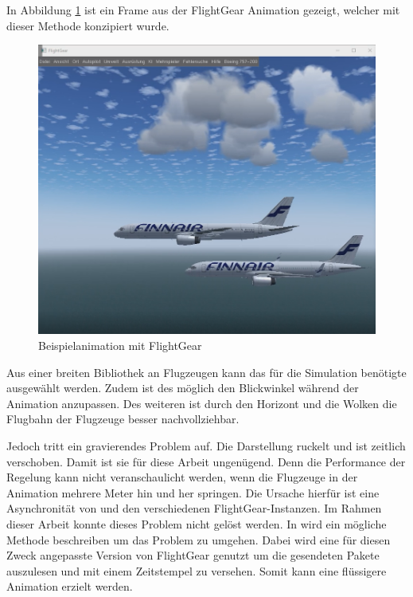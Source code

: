 In Abbildung \ref{fig:VisualFG2Planes} ist ein Frame aus der FlightGear Animation gezeigt, welcher mit dieser Methode konzipiert wurde.
\begin{figure}[h]
	\centering
	\includegraphics[width=\textwidth]{./Bilder/Visual_FG2Planes.png}
	\caption{Beispielanimation mit FlightGear}
	\label{fig:VisualFG2Planes}
\end{figure}
Aus einer breiten Bibliothek an Flugzeugen kann das für die Simulation benötigte ausgewählt werden. Zudem ist des möglich den Blickwinkel während der Animation anzupassen. Des weiteren ist durch den Horizont und die Wolken die Flugbahn der Flugzeuge besser nachvollziehbar. 

Jedoch tritt ein gravierendes Problem auf. Die Darstellung ruckelt und ist zeitlich verschoben. Damit ist sie für diese Arbeit ungenügend. Denn die Performance der Regelung kann nicht veranschaulicht werden, wenn die Flugzeuge in der Animation mehrere Meter hin und her springen. Die Ursache hierfür ist eine Asynchronität von \MatSim und den verschiedenen FlightGear-Instanzen.
Im Rahmen dieser Arbeit konnte dieses Problem nicht gelöst werden. In \cite{FGForum} wird ein mögliche Methode beschreiben um das Problem zu umgehen.
Dabei wird eine für diesen Zweck angepasste Version von FlightGear genutzt um die gesendeten Pakete auszulesen und mit einem Zeitstempel zu versehen. Somit kann eine flüssigere Animation erzielt werden.


